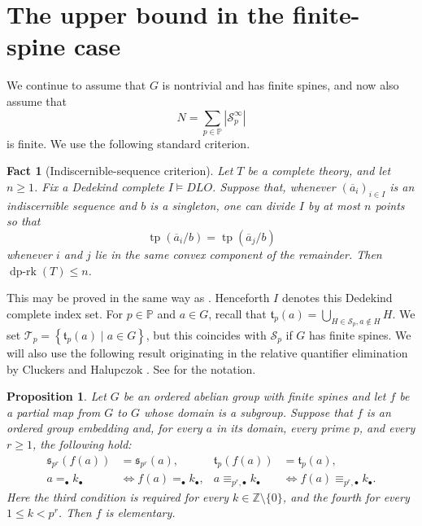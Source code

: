 \documentclass{article}
\theoremstyle{definition}
\theoremstyle{remark}
\theoremstyle{plain}
\newtheorem{prop}[dfn]{Proposition}
\newtheorem{fct}[dfn]{Fact}
\begin{document}
\section{The upper bound in the finite-spine case}

We continue to assume that $G$ is nontrivial and has finite spines, and now also assume that
\[
	N
	=
	\sum_{p\in\mathbb{P}}
	\left|\mathcal{S}_p^\infty\right|
\]
is finite.
We use the following standard criterion.

\begin{fct}[Indiscernible-sequence criterion]\label{fct:DpRankCriterion}
	Let $T$ be a complete theory, and let $n\geq 1$.
	Fix a Dedekind complete $I \models DLO$.
	Suppose that, whenever $(\overline{a}_i)_{i\in I}$ is an indiscernible sequence and $b$ is a singleton, one can divide $I$ by at most $n$ points so that
	\[
		\operatorname{tp}(\overline{a}_i/b)
		=
		\operatorname{tp}(\overline{a}_j/b)
	\]
	whenever $i$ and $j$ lie in the same convex component of the remainder.
	Then $\operatorname{dp\text{-}rk}(T)\leq n$.
\end{fct}

This may be proved in the same way as \cite[Fact 2.10]{Dolich2011DpmBas}.
Henceforth $I$ denotes this Dedekind complete index set.
For $p \in \mathbb{P}$ and $a \in G$, recall that $\mathfrak{t}_p(a) = \bigcup_{H \in \mathcal{S}_p, a \notin H} H$.
We set $\mathcal{T}_p = \left\{ \mathfrak{t}_p(a) \mid a \in G \right\}$, but this coincides with $\mathcal{S}_p$ if $G$ has finite spines.
We will also use the following result originating in the relative quantifier elimination by Cluckers and Halupczok \cite{Cluckers2011QuaEli}.
See \cite[Definition 2.20]{Okura2026DisOrd} for the notation.

\begin{prop}\label{prop:FiniteSpineElementaryMap}
	Let $G$ be an ordered abelian group with finite spines and let $f$ be a partial map from $G$ to $G$ whose domain is a subgroup.
	Suppose that $f$ is an ordered group embedding and, for every $a$ in its domain, every prime $p$, and every $r\geq 1$, the following hold:
	\begin{align*}
		\mathfrak{s}_{p^r}(f(a))&=\mathfrak{s}_{p^r}(a),&
		\mathfrak{t}_p(f(a))&=\mathfrak{t}_p(a),\\
		a=_{\bullet}k_{\bullet}
		&\Longleftrightarrow
		f(a)=_{\bullet}k_{\bullet},&
		a\equiv_{p^r,\bullet}k_{\bullet}
		&\Longleftrightarrow
		f(a)\equiv_{p^r,\bullet}k_{\bullet}.
	\end{align*}
	Here the third condition is required for every $k\in\mathbb{Z}\setminus\{0\}$, and the fourth for every $1\leq k<p^r$.
	Then $f$ is elementary.
\end{prop}
\end{document}
